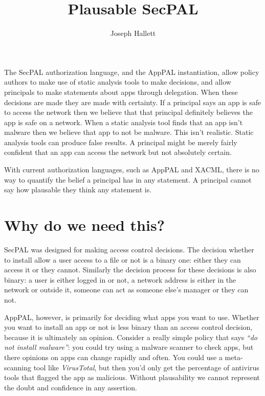 \documentclass[a4paper]{article}
\title{Plausable SecPAL}
\author{Joseph Hallett}
\begin{document}
\maketitle

The SecPAL authorization language, and the AppPAL instantiation, allow policy authors to make use of static analysis tools to make decisions, and allow principals to make statements about apps through delegation.
When these decisions are made they are made with certainty.  If a principal says an app is safe to access the network then we believe that that principal definitely believes the app is safe on a network.
When a static analysis tool finds that an app isn't malware then we believe that app to not be malware.
This isn't realistic.  
Static analysis tools can produce false results.  
A principal might be merely fairly confident that an app can access the network but not absolutely certain.

With current authorization languages, such as AppPAL and XACML, there is no way to quantify the belief a principal has in any statement.
A principal cannot say how plausable they think any statement is.

\section{Why do we need this?}

SecPAL was designed for making access control decisions.
The decision whether to install allow a user access to a file or not is a binary one: either they can access it or they cannot.
Similarly the decision process for these decisions is also binary: a user is either logged in or not, a network address is either in the network or outside it, someone can act as someone else's manager or they can not.

AppPAL, however, is primarily for deciding what apps you want to use.
Whether you want to install an app or not is less binary than an access control decision, because it is ultimately an opinion.
Consider a really simple policy that says \emph{``do not install malware''}:
  you could try using a malware scanner to check apps, but there opinions on apps can change rapidly and often.
You could use a meta-scanning tool like \emph{VirusTotal}, but then you'd only get the percentage of antivirus tools that flagged the app as malicious.
Without plausability we cannot represent the doubt and confidence in any assertion.
\end{document}
